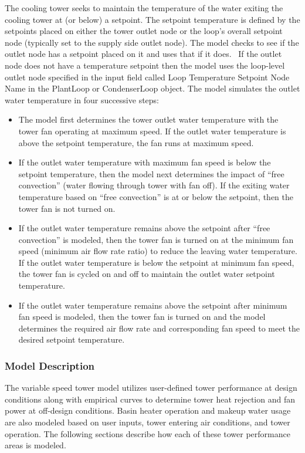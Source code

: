 The cooling tower seeks to maintain the temperature of the water exiting the cooling tower at (or below) a setpoint. The setpoint temperature is defined by the setpoints placed on either the tower outlet node or the loop's overall setpoint node (typically set to the supply side outlet node). The model checks to see if the outlet node has a setpoint placed on it and uses that if it does.~ If the outlet node does not have a temperature setpoint then the model uses the loop-level outlet node specified in the input field called Loop Temperature Setpoint Node Name in the PlantLoop or CondenserLoop object. The model simulates the outlet water temperature in four successive steps:

\begin{itemize}
\item The model first determines the tower outlet water temperature with the tower fan operating at maximum speed. If the outlet water temperature is above the setpoint temperature, the fan runs at maximum speed.
\item If the outlet water temperature with maximum fan speed is below the setpoint temperature, then the model next determines the impact of ``free convection'' (water flowing through tower with fan off). If the exiting water temperature based on ``free convection'' is at or below the setpoint, then the tower fan is not turned on.
\item If the outlet water temperature remains above the setpoint after ``free convection'' is modeled, then the tower fan is turned on at the minimum fan speed (minimum air flow rate ratio) to reduce the leaving water temperature. If the outlet water temperature is below the setpoint at minimum fan speed, the tower fan is cycled on and off to maintain the outlet water setpoint temperature.
\item If the outlet water temperature remains above the setpoint after minimum fan speed is modeled, then the tower fan is turned on and the model determines the required air flow rate and corresponding fan speed to meet the desired setpoint temperature.
\end{itemize}

\subsubsection{Model Description}\label{model-description-1-005}

The variable speed tower model utilizes user-defined tower performance at design conditions along with empirical curves to determine tower heat rejection and fan power at off-design conditions. Basin heater operation and makeup water usage are also modeled based on user inputs, tower entering air conditions, and tower operation. The following sections describe how each of these tower performance areas is modeled.


